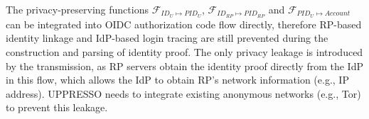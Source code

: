 \vspace{1mm} The privacy-preserving functions $\mathcal{F}_{ID_{U} \mapsto PID_{U}}$, $\mathcal{F}_{ID_{RP} \mapsto PID_{RP}}$ and $\mathcal{F}_{PID_{U} \mapsto Account}$ can be integrated into OIDC authorization code flow directly, therefore  RP-based identity linkage and IdP-based login tracing are still prevented during the construction and parsing of identity proof.
The only privacy leakage is introduced by the transmission, as RP servers obtain the identity proof directly from the IdP in this flow, which allows the IdP to obtain RP's network information (e.g., IP address).
UPPRESSO needs to integrate existing anonymous networks (e.g., Tor)  to prevent this leakage.










